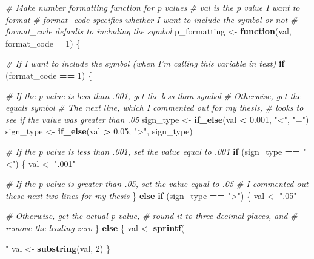 \documentclass[
  openany]{book}
\newenvironment{Shaded}{\begin{snugshade}}{\end{snugshade}}
\newcommand{\CommentTok}[1]{\textcolor[rgb]{0.56,0.35,0.01}{\textit{#1}}}
\newcommand{\ControlFlowTok}[1]{\textcolor[rgb]{0.13,0.29,0.53}{\textbf{#1}}}
\newcommand{\DataTypeTok}[1]{\textcolor[rgb]{0.13,0.29,0.53}{#1}}
\newcommand{\DecValTok}[1]{\textcolor[rgb]{0.00,0.00,0.81}{#1}}
\newcommand{\FloatTok}[1]{\textcolor[rgb]{0.00,0.00,0.81}{#1}}
\newcommand{\KeywordTok}[1]{\textcolor[rgb]{0.13,0.29,0.53}{\textbf{#1}}}
\newcommand{\NormalTok}[1]{#1}
\newcommand{\OperatorTok}[1]{\textcolor[rgb]{0.81,0.36,0.00}{\textbf{#1}}}
\newcommand{\StringTok}[1]{\textcolor[rgb]{0.31,0.60,0.02}{#1}}
\begin{document}
\begin{Shaded}
\begin{Highlighting}[]
\CommentTok{# Make number formatting function for p values}
\CommentTok{# val is the p value I want to format}
\CommentTok{# format_code specifies whether I want to include the symbol or not}
  \CommentTok{# format_code defaults to including the symbol}
\NormalTok{p_formatting <-}\StringTok{ }\ControlFlowTok{function}\NormalTok{(val, }\DataTypeTok{format_code =} \DecValTok{1}\NormalTok{) \{}
  
  \CommentTok{# If I want to include the symbol (when I'm calling this variable in text)}
  \ControlFlowTok{if}\NormalTok{ (format_code }\OperatorTok{==}\StringTok{ }\DecValTok{1}\NormalTok{) \{}
    
    \CommentTok{# If the p value is less than .001, get the less than symbol}
      \CommentTok{# Otherwise, get the equals symbol}
      \CommentTok{# The next line, which I commented out for my thesis,}
      \CommentTok{# looks to see if the value was greater than .05}
\NormalTok{    sign_type <-}\StringTok{ }\KeywordTok{if_else}\NormalTok{(val }\OperatorTok{<}\StringTok{ }\FloatTok{0.001}\NormalTok{, }\StringTok{"<"}\NormalTok{, }\StringTok{"="}\NormalTok{)}
\NormalTok{    sign_type <-}\StringTok{ }\KeywordTok{if_else}\NormalTok{(val }\OperatorTok{>}\StringTok{ }\FloatTok{0.05}\NormalTok{, }\StringTok{">"}\NormalTok{, sign_type)}
    
    \CommentTok{# If the p value is less than .001, set the value equal to .001}
    \ControlFlowTok{if}\NormalTok{ (sign_type }\OperatorTok{==}\StringTok{ "<"}\NormalTok{) \{}
\NormalTok{      val <-}\StringTok{ ".001"}
      
    \CommentTok{# If the p value is greater than .05, set the value equal to .05 }
      \CommentTok{# I commented out these next two lines for my thesis}
\NormalTok{    \} }\ControlFlowTok{else} \ControlFlowTok{if}\NormalTok{ (sign_type }\OperatorTok{==}\StringTok{ ">"}\NormalTok{) \{}
\NormalTok{      val <-}\StringTok{ ".05"}
      
    \CommentTok{# Otherwise, get the actual p value,}
      \CommentTok{# round it to three decimal places, and}
      \CommentTok{# remove the leading zero}
\NormalTok{    \} }\ControlFlowTok{else}\NormalTok{ \{}
\NormalTok{      val <-}\StringTok{ }\KeywordTok{sprintf}\NormalTok{(}\StringTok{"%
\NormalTok{      val <-}\StringTok{ }\KeywordTok{substring}\NormalTok{(val, }\DecValTok{2}\NormalTok{)}
\NormalTok{    \}}
    
}
\end{Highlighting}
\end{Shaded}
\end{document}
